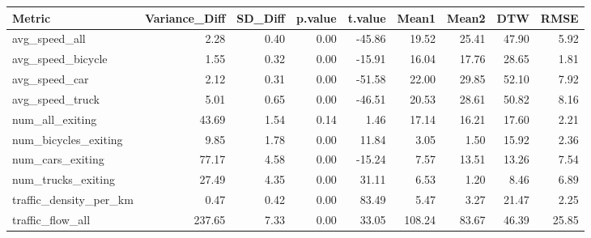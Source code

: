 \begin{table}[ht]
\centering
\begin{tabular}{lrrrrrrrr}
  \hline
Metric & Variance\_Diff & SD\_Diff & p.value & t.value & Mean1 & Mean2 & DTW & RMSE \\ 
  \hline
avg\_speed\_all & 2.28 & 0.40 & 0.00 & -45.86 & 19.52 & 25.41 & 47.90 & 5.92 \\ 
  avg\_speed\_bicycle & 1.55 & 0.32 & 0.00 & -15.91 & 16.04 & 17.76 & 28.65 & 1.81 \\ 
  avg\_speed\_car & 2.12 & 0.31 & 0.00 & -51.58 & 22.00 & 29.85 & 52.10 & 7.92 \\ 
  avg\_speed\_truck & 5.01 & 0.65 & 0.00 & -46.51 & 20.53 & 28.61 & 50.82 & 8.16 \\ 
  num\_all\_exiting & 43.69 & 1.54 & 0.14 & 1.46 & 17.14 & 16.21 & 17.60 & 2.21 \\ 
  num\_bicycles\_exiting & 9.85 & 1.78 & 0.00 & 11.84 & 3.05 & 1.50 & 15.92 & 2.36 \\ 
  num\_cars\_exiting & 77.17 & 4.58 & 0.00 & -15.24 & 7.57 & 13.51 & 13.26 & 7.54 \\ 
  num\_trucks\_exiting & 27.49 & 4.35 & 0.00 & 31.11 & 6.53 & 1.20 & 8.46 & 6.89 \\ 
  traffic\_density\_per\_km & 0.47 & 0.42 & 0.00 & 83.49 & 5.47 & 3.27 & 21.47 & 2.25 \\ 
  traffic\_flow\_all & 237.65 & 7.33 & 0.00 & 33.05 & 108.24 & 83.67 & 46.39 & 25.85 \\ 
   \hline
\end{tabular}
\end{table}
